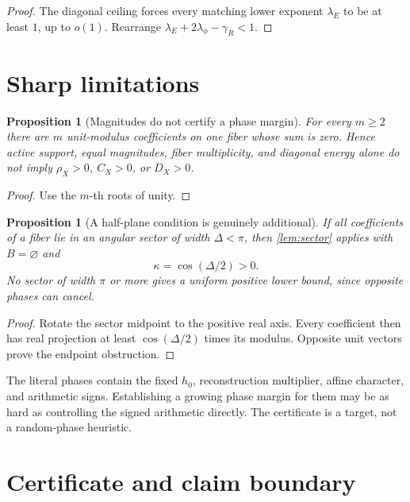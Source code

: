 \documentclass[11pt]{article}
\newtheorem{proposition}[theorem]{Proposition}
\theoremstyle{definition}
\theoremstyle{remark}
\begin{document}
\begin{proof}
The diagonal ceiling forces every matching lower exponent
\(\lambda_E\) to be at least \(1\), up to \(o(1)\).  Rearrange
\(\lambda_E+2\lambda_\phi-\gamma_R<1\).
\end{proof}

\section{Sharp limitations}

\begin{proposition}[Magnitudes do not certify a phase margin]
\label{prop:roots}
For every \(m\ge2\) there are \(m\) unit-modulus coefficients on one
fiber whose sum is zero.  Hence active support, equal magnitudes,
fiber multiplicity, and diagonal energy alone do not imply
\(\rho_X>0\), \(C_X>0\), or \(D_X>0\).
\end{proposition}

\begin{proof}
Use the \(m\)-th roots of unity.
\end{proof}

\begin{proposition}[A half-plane condition is genuinely additional]
If all coefficients of a fiber lie in an angular sector of width
\(\Delta<\pi\), then \cref{lem:sector} applies with \(B=\varnothing\)
and
\[
 \kappa=\cos(\Delta/2)>0.
\]
No sector of width \(\pi\) or more gives a uniform positive lower
bound, since opposite phases can cancel.
\end{proposition}

\begin{proof}
Rotate the sector midpoint to the positive real axis.  Every
coefficient then has real projection at least
\(\cos(\Delta/2)\) times its modulus.  Opposite unit vectors prove
the endpoint obstruction.
\end{proof}

The literal phases contain the fixed \(h_0\), reconstruction
multiplier, affine character, and arithmetic signs.  Establishing a
growing phase margin for them may be as hard as controlling the
signed arithmetic directly.  The certificate is a target, not a
random-phase heuristic.

\section{Certificate and claim boundary}
\end{document}
